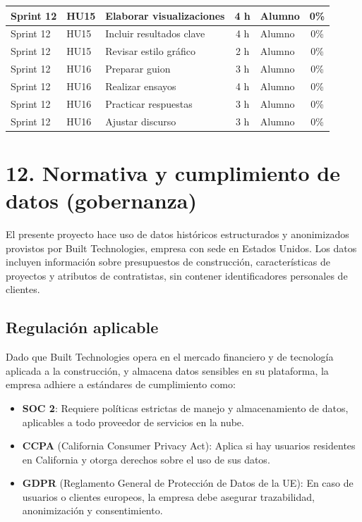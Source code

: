 \documentclass[
11pt, %
]{charter}
\begin{document}
\begin{table}[htpb]
\begin{tabularx}{\linewidth}{@{}|l|l|X|c|l|c|@{}}
Sprint 12 & HU15 & Elaborar visualizaciones & 4 h & Alumno & 0\% \\ \hline
Sprint 12 & HU15 & Incluir resultados clave & 4 h & Alumno & 0\% \\ \hline
Sprint 12 & HU15 & Revisar estilo gráfico & 2 h & Alumno & 0\% \\ \hline
Sprint 12 & HU16 & Preparar guion & 3 h & Alumno & 0\% \\ \hline
Sprint 12 & HU16 & Realizar ensayos & 4 h & Alumno & 0\% \\ \hline
Sprint 12 & HU16 & Practicar respuestas & 3 h & Alumno & 0\% \\ \hline
Sprint 12 & HU16 & Ajustar discurso & 3 h & Alumno & 0\% \\ \hline

\end{tabularx}
\end{table}

\section{12. Normativa y cumplimiento de datos (gobernanza)}

El presente proyecto hace uso de datos históricos estructurados y anonimizados provistos por Built Technologies, empresa con sede en Estados Unidos. Los datos incluyen información sobre presupuestos de construcción, características de proyectos y atributos de contratistas, sin contener identificadores personales de clientes.

\subsection*{Regulación aplicable}

Dado que Built Technologies opera en el mercado financiero y de tecnología aplicada a la construcción, y almacena datos sensibles en su plataforma, la empresa adhiere a estándares de cumplimiento como:

\begin{itemize}
    \item \textbf{SOC 2}: Requiere políticas estrictas de manejo y almacenamiento de datos, aplicables a todo proveedor de servicios en la nube.
    \item \textbf{CCPA} (California Consumer Privacy Act): Aplica si hay usuarios residentes en California y otorga derechos sobre el uso de sus datos.
    \item \textbf{GDPR} (Reglamento General de Protección de Datos de la UE): En caso de usuarios o clientes europeos, la empresa debe asegurar trazabilidad, anonimización y consentimiento.
\end{itemize}
\end{document}
